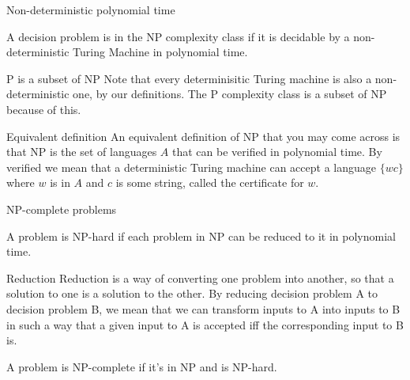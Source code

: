 \begin{frame}{Non-deterministic polynomial time}
  \begin{definition}
    A decision problem is in the NP complexity class if it is decidable by a non-deterministic Turing Machine in polynomial time.
  \end{definition}
  
  \begin{alertblock}{P is a subset of NP}
    Note that every determinisitic Turing machine is also a non-deterministic one, by our definitions.
    The P complexity class is a subset of NP because of this.
  \end{alertblock}

  \begin{alertblock}{Equivalent definition}
    An equivalent definition of NP that you may come across is that NP is the set of languages $A$ that can be verified in polynomial time.
    By verified we mean that a deterministic Turing machine can accept a language $\{ wc \}$ where $w$ is in $A$ and $c$ is some string, called the certificate for $w$.
  \end{alertblock}

\end{frame}


\begin{frame}{NP-complete problems}
  \begin{definition}
    A problem is NP-hard if each problem in NP can be reduced to it in polynomial time.
  \end{definition}

  \begin{alertblock}{Reduction}
    Reduction is a way of converting one problem into another, so that a solution to one is a solution to the other.
    By reducing decision problem A to decision problem B, we mean that we can transform inputs to A into inputs to B in such a way that a given input to A is accepted iff the corresponding input to B is.
  \end{alertblock}

  \begin{definition}
    A problem is NP-complete if it's in NP and is NP-hard.
  \end{definition}
\end{frame}



